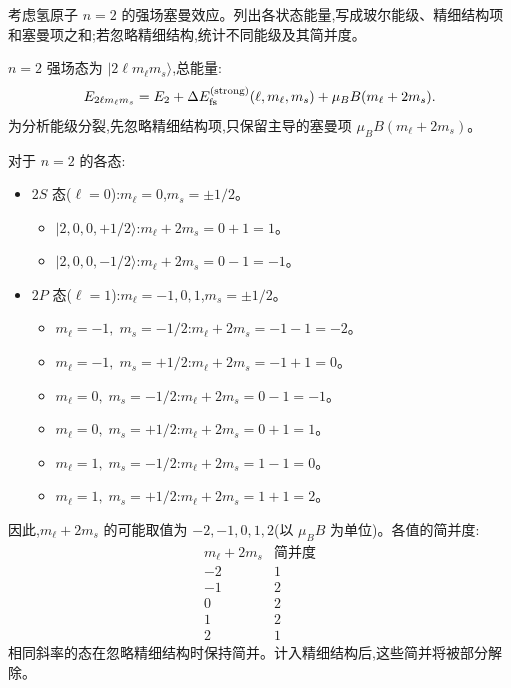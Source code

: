 \begin{question}
考虑氢原子 $n=2$ 的强场塞曼效应。列出各状态能量,写成玻尔能级、精细结构项和塞曼项之和;若忽略精细结构,统计不同能级及其简并度。
\end{question}
\begin{solution}
$n=2$ 强场态为 $|2\ell m_\ell m_s\rangle$,总能量:
\[
E_{2\ell m_\ell m_s}=E_2+\Delta E_{\rm fs}^{\rm(strong)}(\ell,m_\ell,m_s)+\mu_B B(m_\ell+2m_s).
\]
为分析能级分裂,先忽略精细结构项,只保留主导的塞曼项 $\mu_BB(m_\ell+2m_s)$。

对于 $n=2$ 的各态:
\begin{itemize}
\item $2S$ 态($\ell=0$):$m_\ell=0$,$m_s=\pm1/2$。
  \begin{itemize}
  \item $|2,0,0,+1/2\rangle$:$m_\ell+2m_s=0+1=1$。
  \item $|2,0,0,-1/2\rangle$:$m_\ell+2m_s=0-1=-1$。
  \end{itemize}
\item $2P$ 态($\ell=1$):$m_\ell=-1,0,1$,$m_s=\pm1/2$。
  \begin{itemize}
  \item $m_\ell=-1,\;m_s=-1/2$:$m_\ell+2m_s=-1-1=-2$。
  \item $m_\ell=-1,\;m_s=+1/2$:$m_\ell+2m_s=-1+1=0$。
  \item $m_\ell=0,\;m_s=-1/2$:$m_\ell+2m_s=0-1=-1$。
  \item $m_\ell=0,\;m_s=+1/2$:$m_\ell+2m_s=0+1=1$。
  \item $m_\ell=1,\;m_s=-1/2$:$m_\ell+2m_s=1-1=0$。
  \item $m_\ell=1,\;m_s=+1/2$:$m_\ell+2m_s=1+1=2$。
  \end{itemize}
\end{itemize}

因此,$m_\ell+2m_s$ 的可能取值为 $-2,-1,0,1,2$(以 $\mu_BB$ 为单位)。各值的简并度:
\[
\begin{array}{c|c}
m_\ell+2m_s & \text{简并度}\\ \hline
-2 & 1\\
-1 & 2\\
0 & 2\\
1 & 2\\
2 & 1
\end{array}
\]
相同斜率的态在忽略精细结构时保持简并。计入精细结构后,这些简并将被部分解除。
\end{solution}

